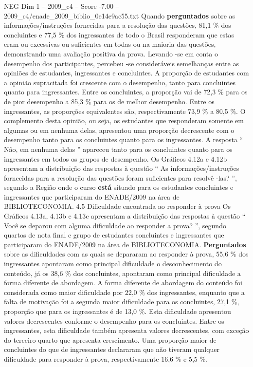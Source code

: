 \begin{textsample}{NEG Dim 1 – 2009\_c4 – Score -7.00 – 2009\_c4/enade\_2009\_biblio\_0e14e9ac55.txt}
Quando \textbf{perguntados} sobre as informações/instruções fornecidas para a resolução das questões, 81,1 \% dos concluintes e 77,5 \% dos ingressantes de todo o Brasil responderam que estas eram ou excessivas ou suficientes em todas ou na maioria das questões, demonstrando uma avaliação positiva da prova.
Levando -se em conta o desempenho dos participantes, percebeu -se consideráveis semelhanças entre as opiniões de estudantes, ingressantes e concluintes.
A proporção de estudantes com a opinião supracitada foi crescente com o desempenho, tanto para concluintes quanto para ingressantes.
Entre os concluintes, a proporção vai de 72,3 \% para os de pior desempenho a 85,3 \% para os de melhor desempenho.
Entre os ingressantes, as proporções equivalentes são, respectivamente 73,9 \% a 80,5 \%.
O complemento desta opinião, ou seja, os estudantes que responderam somente em algumas ou em nenhuma delas, apresentou uma proporção decrescente com o desempenho tanto para os concluintes quanto para os ingressantes.
A resposta “ Não, em nenhuma delas ” apareceu tanto para os concluintes quanto para os ingressantes em todos os grupos de desempenho.
Os Gráficos 4.12a e 4.12b apresentam a distribuição das respostas à questão “ As informações/instruções fornecidas para a resolução das questões foram suficientes para resolvê -las? ”, segundo a Região onde o curso \textbf{está} situado para os estudantes concluintes e ingressantes que participaram do ENADE/2009 na área de BIBLIOTECONOMIA. 4.5 Dificuldade encontrada ao responder à prova Os Gráficos 4.13a, 4.13b e 4.13c apresentam a distribuição das respostas à questão “ Você se deparou com alguma dificuldade ao responder a prova? ”, segundo quartos de nota final e grupo de estudantes concluintes e ingressantes que participaram do ENADE/2009 na área de BIBLIOTECONOMIA. \textbf{Perguntados} sobre as dificuldades com as quais se depararam ao responder à prova, 55,6 \% dos ingressantes apontaram como principal dificuldade o desconhecimento do conteúdo, já os 38,6 \% dos concluintes, apontaram como principal dificuldade a forma diferente de abordagem.
A forma diferente de abordagem do conteúdo foi considerada como maior dificuldade por 22,0 \% dos ingressantes, enquanto que a falta de motivação foi a segunda maior dificuldade para os concluintes, 27,1 \%, proporção que para os ingressantes é de 13,0 \%.
Esta dificuldade apresentou valores decrescentes conforme o desempenho para os concluintes.
Entre os ingressantes, esta dificuldade também apresenta valores decrescentes, com exceção do terceiro quarto que apresenta crescimento.
Uma proporção maior de concluintes do que de ingressantes declararam que não tiveram qualquer dificuldade para responder à prova, respectivamente 16,6 \% e 5,5 \%.

\end{textsample}
